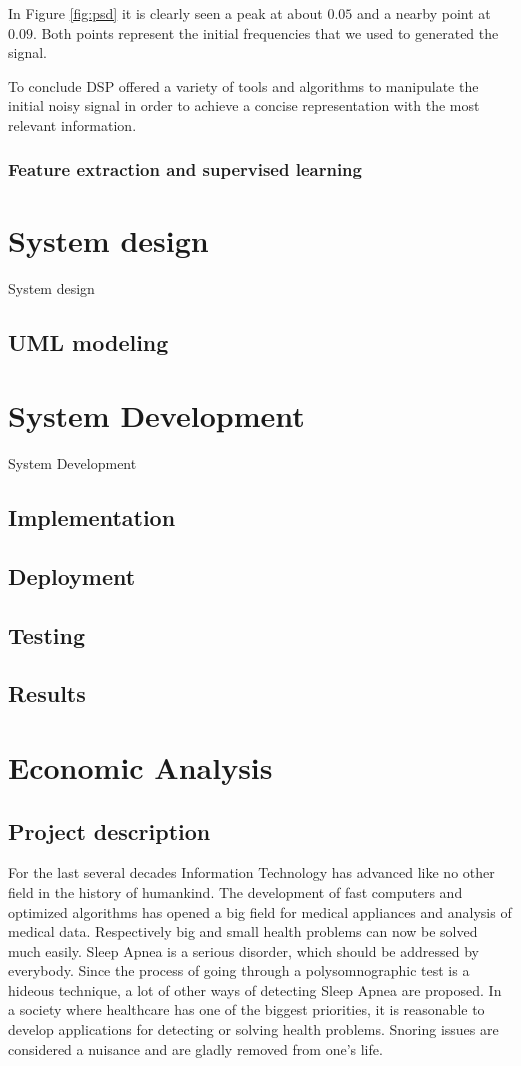 \documentclass[12pt,a4paper]{report}
\begin{document}
In Figure \ref{fig:psd} it is clearly seen a peak at about $0.05$ and a nearby point at $0.09$. Both points represent the initial frequencies that we used to generated the signal. 

To conclude DSP offered a variety of tools and algorithms to manipulate the initial noisy signal in order to achieve a concise representation with the most relevant information.

\subsection{Feature extraction and supervised learning}


\chapter{System design}
System design
\section{UML modeling}

\chapter{System Development}
System Development
\section{Implementation}
\section{Deployment}
\section{Testing}
\section{Results}

\chapter{Economic Analysis}
\section{Project description}
For the last several decades Information Technology has advanced like no other field in the history of humankind. The development of fast computers and optimized algorithms has opened a big field for medical appliances and analysis of medical data. Respectively big and small health problems can now be solved much easily. Sleep Apnea is a serious disorder, which should be addressed by everybody. Since the process of going through a polysomnographic test is a hideous technique, a lot of other ways of detecting Sleep Apnea are proposed. In a society where healthcare has one of the biggest priorities, it is reasonable to develop applications for detecting or solving health problems. Snoring issues are considered a nuisance and are gladly removed from one's life.
\end{document}
